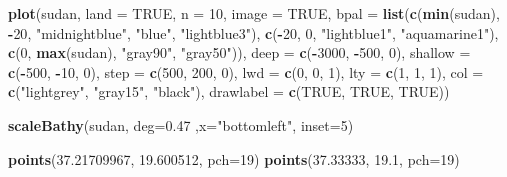 \documentclass[]{article}
\newenvironment{Shaded}{\begin{snugshade}}{\end{snugshade}}
\newcommand{\KeywordTok}[1]{\textcolor[rgb]{0.13,0.29,0.53}{\textbf{#1}}}
\newcommand{\DataTypeTok}[1]{\textcolor[rgb]{0.13,0.29,0.53}{#1}}
\newcommand{\DecValTok}[1]{\textcolor[rgb]{0.00,0.00,0.81}{#1}}
\newcommand{\FloatTok}[1]{\textcolor[rgb]{0.00,0.00,0.81}{#1}}
\newcommand{\StringTok}[1]{\textcolor[rgb]{0.31,0.60,0.02}{#1}}
\newcommand{\OtherTok}[1]{\textcolor[rgb]{0.56,0.35,0.01}{#1}}
\newcommand{\OperatorTok}[1]{\textcolor[rgb]{0.81,0.36,0.00}{\textbf{#1}}}
\newcommand{\NormalTok}[1]{#1}
\begin{document}
\begin{Shaded}
\begin{Highlighting}[]
\KeywordTok{plot}\NormalTok{(sudan, }\DataTypeTok{land =} \OtherTok{TRUE}\NormalTok{, }\DataTypeTok{n =} \DecValTok{10}\NormalTok{, }\DataTypeTok{image =} \OtherTok{TRUE}\NormalTok{,}
     \DataTypeTok{bpal =} \KeywordTok{list}\NormalTok{(}\KeywordTok{c}\NormalTok{(}\KeywordTok{min}\NormalTok{(sudan), }\OperatorTok{-}\DecValTok{20}\NormalTok{, }\StringTok{"midnightblue"}\NormalTok{, }\StringTok{"blue"}\NormalTok{, }\StringTok{"lightblue3"}\NormalTok{),}
                 \KeywordTok{c}\NormalTok{(}\OperatorTok{-}\DecValTok{20}\NormalTok{, }\DecValTok{0}\NormalTok{, }\StringTok{"lightblue1"}\NormalTok{, }\StringTok{"aquamarine1"}\NormalTok{),}
                 \KeywordTok{c}\NormalTok{(}\DecValTok{0}\NormalTok{, }\KeywordTok{max}\NormalTok{(sudan), }\StringTok{"gray90"}\NormalTok{, }\StringTok{"gray50"}\NormalTok{)), }
     \DataTypeTok{deep =} \KeywordTok{c}\NormalTok{(}\OperatorTok{-}\DecValTok{3000}\NormalTok{, }\OperatorTok{-}\DecValTok{500}\NormalTok{, }\DecValTok{0}\NormalTok{),}
     \DataTypeTok{shallow =} \KeywordTok{c}\NormalTok{(}\OperatorTok{-}\DecValTok{500}\NormalTok{, }\OperatorTok{-}\DecValTok{10}\NormalTok{, }\DecValTok{0}\NormalTok{),}
     \DataTypeTok{step =} \KeywordTok{c}\NormalTok{(}\DecValTok{500}\NormalTok{, }\DecValTok{200}\NormalTok{, }\DecValTok{0}\NormalTok{),}
     \DataTypeTok{lwd =} \KeywordTok{c}\NormalTok{(}\DecValTok{0}\NormalTok{, }\DecValTok{0}\NormalTok{, }\DecValTok{1}\NormalTok{), }\DataTypeTok{lty =} \KeywordTok{c}\NormalTok{(}\DecValTok{1}\NormalTok{, }\DecValTok{1}\NormalTok{, }\DecValTok{1}\NormalTok{),}
     \DataTypeTok{col =} \KeywordTok{c}\NormalTok{(}\StringTok{"lightgrey"}\NormalTok{, }\StringTok{"gray15"}\NormalTok{, }\StringTok{"black"}\NormalTok{),}
     \DataTypeTok{drawlabel =} \KeywordTok{c}\NormalTok{(}\OtherTok{TRUE}\NormalTok{, }\OtherTok{TRUE}\NormalTok{, }\OtherTok{TRUE}\NormalTok{))}


\KeywordTok{scaleBathy}\NormalTok{(sudan, }\DataTypeTok{deg=}\FloatTok{0.47}\NormalTok{ ,}\DataTypeTok{x=}\StringTok{"bottomleft"}\NormalTok{, }\DataTypeTok{inset=}\DecValTok{5}\NormalTok{)}

\KeywordTok{points}\NormalTok{(}\FloatTok{37.21709967}\NormalTok{, }\FloatTok{19.600512}\NormalTok{, }\DataTypeTok{pch=}\DecValTok{19}\NormalTok{)}
\KeywordTok{points}\NormalTok{(}\FloatTok{37.33333}\NormalTok{, }\FloatTok{19.1}\NormalTok{, }\DataTypeTok{pch=}\DecValTok{19}\NormalTok{)}


\end{Highlighting}
\end{Shaded}
\end{document}
